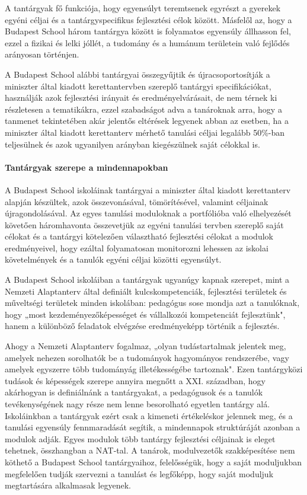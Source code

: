 A tantárgyak fő funkciója, hogy egyensúlyt teremtsenek egyrészt a gyerekek egyéni céljai és a tantárgyspecifikus fejlesztési célok között. Másfelől az, hogy a Budapest School három tantárgya között is folyamatos egyensúly állhasson fel, ezzel a fizikai és lelki jóllét, a tudomány és a humánum területein való fejlődés arányosan történjen.

A Budapest School alábbi tantárgyai összegyűjtik és újracsoportosítják a miniszter által kiadott kerettantervben szereplő tantárgyi specifikációkat, használják azok fejlesztési irányait és eredményelvárásait, de nem térnek ki részletesen a tematikákra, ezzel szabadságot adva a tanároknak arra, hogy a tanmenet tekintetében akár jelentős eltérések legyenek abban az esetben, ha a miniszter által kiadott kerettanterv mérhető tanulási  céljai legalább 50\%-ban teljesülnek és azok ugyanilyen arányban kiegészülnek saját célokkal is.

\paragraph{Tantárgyak szerepe a mindennapokban}

A Budapest School iskoláinak tantárgyai a miniszter által kiadott kerettanterv alapján készültek, azok összevonásával, tömörítésével, valamint céljainak újragondolásával. Az egyes tanulási moduloknak a portfólióba való elhelyezését követően háromhavonta összevetjük az egyéni tanulási tervben szereplő saját célokat és a tantárgyi kötelezően választható fejlesztési célokat a modulok eredményeivel, hogy ezáltal folyamatosan monitorozni lehessen az iskolai követelmények és a tanulók egyéni céljai közötti egyensúlyt.

A Budapest School iskoláiban a tantárgyak ugyanúgy kapnak szerepet, mint a Nemzeti Alaptanterv által definiált kulcskompetenciák, fejlesztési területek és műveltségi területek minden iskolában: pedagógus sose mondja azt a tanulóknak, hogy „most kezdeményezőképességet és vállalkozói kompetenciát fejlesztünk", hanem a különböző feladatok elvégzése eredményeképp történik a fejlesztés.

Ahogy a Nemzeti Alaptanterv fogalmaz, „olyan tudástartalmak jelentek meg, amelyek nehezen sorolhatók be a tudományok hagyományos rendszerébe, vagy amelyek egyszerre több tudományág illetékességébe tartoznak". Ezen tantárgyközi tudások és képességek szerepe annyira megnőtt a XXI. században, hogy akárhogyan is definiálnánk a tantárgyakat, a pedagógusok és a tanulók tevékenységének nagy része nem lenne besorolható egyetlen tantárgy alá. Iskoláinkban a tantárgyak ezért csak a kimeneti értékeléskor jelennek meg, és a tanulási egyensúly fennmaradását segítik, a mindennapok struktúráját azonban a modulok adják. Egyes modulok több tantárgy fejlesztési céljainak is eleget tehetnek, összhangban a NAT-tal. A tanárok, modulvezetők szakképesítése nem köthető a Budapest School tantárgyaihoz, felelősségük, hogy a saját moduljukban megfelelően tudják szervezni a tanulást és legfőképp, hogy saját moduljuk megtartására alkalmasak legyenek.


